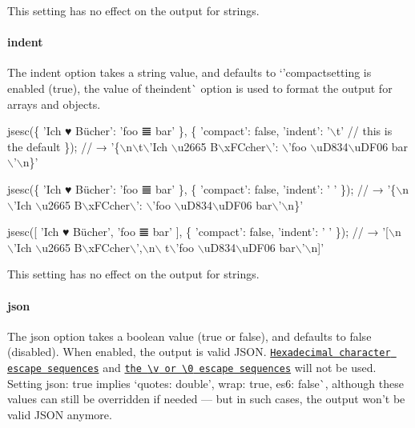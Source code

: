 This setting has no effect on the output for strings.

\paragraph*{{\ttfamily indent}}

The {\ttfamily indent} option takes a string value, and defaults to `'compact{\ttfamily setting is enabled (}true{\ttfamily ), the value of the}indent\`{} option is used to format the output for arrays and objects.


\begin{DoxyCode}
jsesc(\{ 'Ich ♥ Bücher': 'foo 𝌆 bar' \}, \{
  'compact': false,
  'indent': '\(\backslash\)t' // this is the default
\});
// → '\{\(\backslash\)n\(\backslash\)t\(\backslash\)'Ich \(\backslash\)u2665 B\(\backslash\)xFCcher\(\backslash\)': \(\backslash\)'foo \(\backslash\)uD834\(\backslash\)uDF06 bar\(\backslash\)'\(\backslash\)n\}'

jsesc(\{ 'Ich ♥ Bücher': 'foo 𝌆 bar' \}, \{
  'compact': false,
  'indent': '  '
\});
// → '\{\(\backslash\)n  \(\backslash\)'Ich \(\backslash\)u2665 B\(\backslash\)xFCcher\(\backslash\)': \(\backslash\)'foo \(\backslash\)uD834\(\backslash\)uDF06 bar\(\backslash\)'\(\backslash\)n\}'

jsesc([ 'Ich ♥ Bücher', 'foo 𝌆 bar' ], \{
  'compact': false,
  'indent': '  '
\});
// → '[\(\backslash\)n  \(\backslash\)'Ich \(\backslash\)u2665 B\(\backslash\)xFCcher\(\backslash\)',\(\backslash\)n\(\backslash\)  t\(\backslash\)'foo \(\backslash\)uD834\(\backslash\)uDF06 bar\(\backslash\)'\(\backslash\)n]'
\end{DoxyCode}


This setting has no effect on the output for strings.

\paragraph*{{\ttfamily json}}

The {\ttfamily json} option takes a boolean value ({\ttfamily true} or {\ttfamily false}), and defaults to {\ttfamily false} (disabled). When enabled, the output is valid J\+S\+ON. \href{http://mathiasbynens.be/notes/javascript-escapes#hexadecimal}{\tt Hexadecimal character escape sequences} and \href{http://mathiasbynens.be/notes/javascript-escapes#single}{\tt the {\ttfamily \textbackslash{}v} or {\ttfamily \textbackslash{}0} escape sequences} will not be used. Setting {\ttfamily json\+: true} implies `quotes\+: \textquotesingle{}double', wrap\+: true, es6\+: false\`{}, although these values can still be overridden if needed — but in such cases, the output won’t be valid J\+S\+ON anymore.


